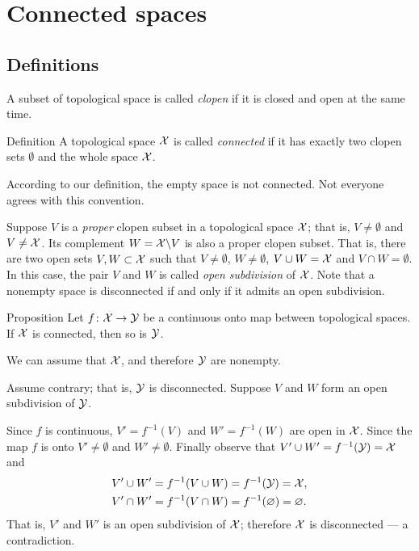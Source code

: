 \chapter{Connected spaces}

\section{Definitions}

A subset of topological space is called \emph{clopen} if it is closed and open at the same time.

\begin{thm}{Definition}
A topological space $\mathcal{X}$ is called \emph{connected} if it has exactly two clopen sets $\emptyset$ and the whole space $\mathcal{X}$.
\end{thm}

According to our definition, the empty space is not connected.
Not everyone agrees with this convention.

Suppose $V$ is a \emph{proper} clopen subset in a topological space $\mathcal{X}$; that is, $V\ne\emptyset$ and $V\ne\mathcal{X}$.
Its complement $W=\mathcal{X}\backslash V$ is also a proper clopen subset.
That is, there are two open sets $V,W\subset \mathcal{X}$ such that $V\ne\emptyset$, $W\ne\emptyset$, $V\cup W=\mathcal{X}$ and $V\cap W=\emptyset$.
In this case, the pair $V$ and $W$ is called \emph{open subdivision} of $\mathcal{X}$.
Note that a nonempty space is disconnected if and only if it admits an open subdivision. 

\begin{thm}{Proposition}\label{prop:image-connected}
Let $f\colon\mathcal{X}\to \mathcal{Y}$ be a continuous onto map between topological spaces.
If $\mathcal{X}$ is connected, then so is $\mathcal{Y}$.
\end{thm}

We can assume that $\mathcal{X}$, and therefore $\mathcal{Y}$ are nonempty.

Assume contrary; that is, $\mathcal{Y}$ is disconnected.
Suppose $V$ and $W$ form an open subdivision of $\mathcal{Y}$.

Since $f$ is continuous, $V'=f^{-1}(V)$ and $W'=f^{-1}(W)$ are open in $\mathcal{X}$.
Since the map $f$ is onto $V'\ne\emptyset$ and $W'\ne\emptyset$.
Finally observe that $V'\cup W'=f^{-1}(\mathcal{Y}) =\mathcal{X}$ and
\begin{align*}
V'\cup W'&=f^{-1}(V\cup W)=f^{-1}(\mathcal{Y})=\mathcal{X},
\\
V'\cap W'&=f^{-1}(V\cap W)=f^{-1}(\varnothing)=\varnothing.
\end{align*}
That is, $V'$ and $W'$ is an open subdivision of $\mathcal{X}$; 
therefore $\mathcal{X}$ is disconnected --- a contradiction.
\qeds

